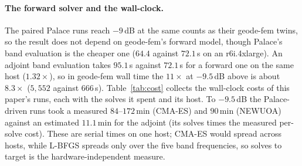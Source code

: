 \documentclass{anvil-paper}
\begin{document}
\paragraph{The forward solver and the wall-clock.}
The paired Palace runs reach $-9$\,dB at the same counts as their geode-fem
twins, so the result does not depend on geode-fem's forward model, though
Palace's band evaluation is the cheaper one ($64.4$ against $72.1$\,s on an
r6i.4xlarge). An adjoint band evaluation takes $95.1$\,s against $72.1$\,s
for a forward one on the same host ($1.32\times$), so in geode-fem wall time
the $11\times$ at $-9.5$\,dB above is about $8.3\times$ ($5{,}552$ against
$666$\,s). Table~\ref{tab:cost} collects the wall-clock costs of this
paper's runs, each with the solves it spent and its host. To $-9.5$\,dB the
Palace-driven runs took a measured $84$--$172$\,min (CMA-ES) and $90$\,min
(NEWUOA) against an estimated $11.1$\,min for the adjoint (its solves times
the measured per-solve cost). These are serial times on one host; CMA-ES
would spread across hosts, while L-BFGS spreads only over the five band
frequencies, so solves to target is the hardware-independent measure.
\end{document}
